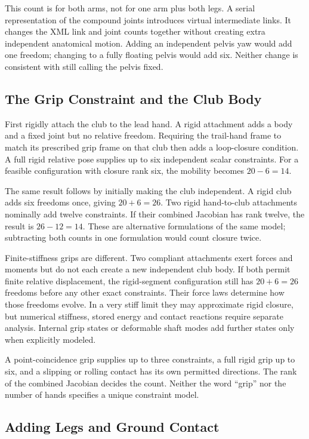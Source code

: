 This count is for both arms, not for one arm plus both legs. A serial representation of the compound joints introduces virtual intermediate links. It changes the XML link and joint counts together without creating extra independent anatomical motion. Adding an independent pelvis yaw would add one freedom; changing to a fully floating pelvis would add six. Neither change is consistent with still calling the pelvis fixed.

\subsection{The Grip Constraint and the Club Body}
\label{princ:prin:dof_practice}

First rigidly attach the club to the lead hand. A rigid attachment adds a body and a fixed joint but no relative freedom. Requiring the trail-hand frame to match its prescribed grip frame on that club then adds a loop-closure condition. A full rigid relative pose supplies up to six independent scalar constraints. For a feasible configuration with closure rank six, the mobility becomes $20-6=14$.

The same result follows by initially making the club independent. A rigid club adds six freedoms once, giving $20+6=26$. Two rigid hand-to-club attachments nominally add twelve constraints. If their combined Jacobian has rank twelve, the result is $26-12=14$. These are alternative formulations of the same model; subtracting both counts in one formulation would count closure twice.

Finite-stiffness grips are different. Two compliant attachments exert forces and moments but do not each create a new independent club body. If both permit finite relative displacement, the rigid-segment configuration still has $20+6=26$ freedoms before any other exact constraints. Their force laws determine how those freedoms evolve. In a very stiff limit they may approximate rigid closure, but numerical stiffness, stored energy and contact reactions require separate analysis. Internal grip states or deformable shaft modes add further states only when explicitly modeled.

A point-coincidence grip supplies up to three constraints, a full rigid grip up to six, and a slipping or rolling contact has its own permitted directions. The rank of the combined Jacobian decides the count. Neither the word ``grip'' nor the number of hands specifies a unique constraint model.

\subsection{Adding Legs and Ground Contact}

